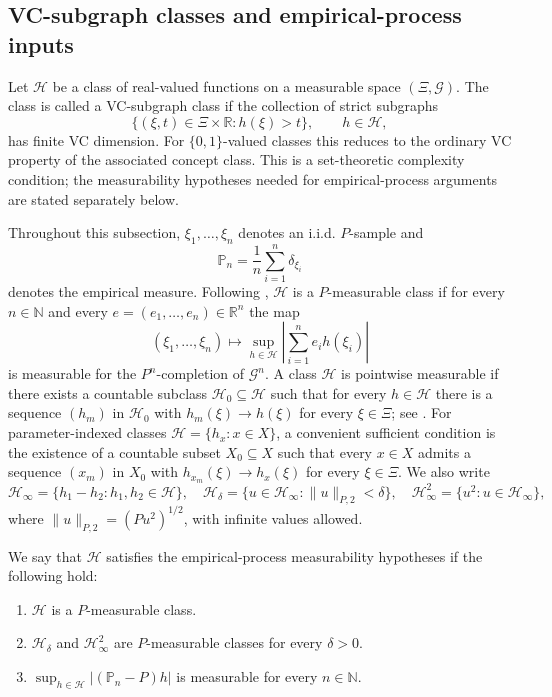 \documentclass[11pt]{article}
\begin{document}
\subsection{VC-subgraph classes and empirical-process inputs}
\label{subsec:vc}

Let $\mathcal{H}$ be a class of real-valued functions on a measurable
space $(\Xi,\mathcal{G})$. The class is called a VC-subgraph class
if the collection of strict subgraphs 
\[
\bigl\{(\xi,t)\in\Xi\times\mathbb{R}:h(\xi)>t\bigr\},\qquad h\in\mathcal{H},
\]
has finite VC dimension. For $\{0,1\}$-valued classes this reduces
to the ordinary VC property of the associated concept class. This is
a set-theoretic complexity condition; the measurability hypotheses
needed for empirical-process arguments are stated separately below.

Throughout this subsection, $\xi_{1},\dots,\xi_{n}$ denotes an i.i.d.
$P$-sample and 
\[
\mathbb{P}_{n}=\frac{1}{n}\sum_{i=1}^{n}\delta_{\xi_{i}}
\]
denotes the empirical measure. Following \citet[Definition~2.3.3]{vdVW2023},
$\mathcal{H}$ is a $P$-measurable class if for every $n\in\mathbb{N}$
and every $e=(e_{1},\dots,e_{n})\in\mathbb{R}^{n}$ the map 
\[
(\xi_{1},\dots,\xi_{n})\longmapsto\sup_{h\in\mathcal{H}}\left|\sum_{i=1}^{n}e_{i}h(\xi_{i})\right|
\]
is measurable for the $P^{n}$-completion of $\mathcal{G}^{n}$. A class
$\mathcal{H}$ is pointwise measurable if there exists a countable subclass
$\mathcal{H}_{0}\subseteq\mathcal{H}$ such that for every $h\in\mathcal{H}$
there is a sequence $(h_{m})$ in $\mathcal{H}_{0}$ with $h_{m}(\xi)\to h(\xi)$
for every $\xi\in\Xi$; see \citet[Example~2.3.4]{vdVW2023}.
For parameter-indexed classes $\mathcal{H}=\{h_{x}:x\in X\}$, a convenient
sufficient condition is the existence of a countable subset $X_{0}\subseteq X$
such that every $x\in X$ admits a sequence $(x_{m})$ in $X_{0}$
with $h_{x_{m}}(\xi)\to h_{x}(\xi)$ for every $\xi\in\Xi$. We also write
\[
\mathcal{H}_{\infty}=\{h_{1}-h_{2}:h_{1},h_{2}\in\mathcal{H}\},\quad
\mathcal{H}_{\delta}=\{u\in\mathcal{H}_{\infty}:\lVert u\rVert_{P,2}<\delta\},\quad
\mathcal{H}_{\infty}^{2}=\{u^{2}:u\in\mathcal{H}_{\infty}\},
\]
where $\lVert u\rVert_{P,2}=(Pu^{2})^{1/2}$, with infinite values allowed.

\begin{assumption}\label{ass:ep-meas}
We say that $\mathcal{H}$ satisfies the empirical-process measurability
hypotheses if the following hold:
\begin{enumerate}[label=(\roman*),itemsep=0.25em]
\item $\mathcal{H}$ is a $P$-measurable class.
\item $\mathcal{H}_{\delta}$ and $\mathcal{H}_{\infty}^{2}$ are $P$-measurable classes
for every $\delta>0$.
\item $\sup_{h\in\mathcal{H}}\lvert(\mathbb{P}_{n}-P)h\rvert$ is measurable
for every $n\in\mathbb{N}$.
\end{enumerate}
\end{assumption}
\end{document}
